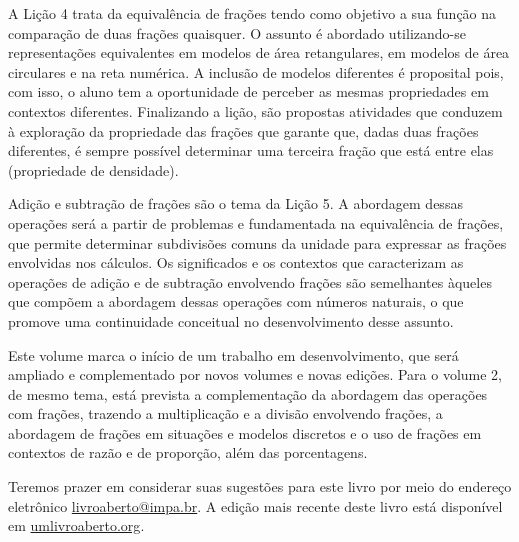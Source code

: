 A Lição 4 trata da equivalência de frações tendo como objetivo a sua função na comparação de duas frações quaisquer. O assunto é abordado utilizando-se representações equivalentes em modelos de área retangulares, em modelos de área circulares e na reta numérica. A inclusão de modelos diferentes é proposital pois, com isso, o aluno tem a oportunidade de perceber as mesmas propriedades em contextos diferentes. Finalizando a lição, são propostas atividades que conduzem à exploração da propriedade das frações que garante que, dadas duas frações diferentes, é sempre possível determinar uma terceira fração que está entre elas (propriedade de densidade).

Adição e subtração de frações são o tema da Lição 5.
A abordagem dessas operações será a partir de problemas e fundamentada na equivalência de frações, que permite determinar subdivisões comuns da unidade para expressar as frações envolvidas nos cálculos.
Os significados e os contextos que caracterizam as operações de adição e de subtração ​envolvendo frações são semelhantes àqueles que compõem a abordagem dessas operações com números naturais, ​o que ​promove​​ uma continuidade conceitual ​no desenvolvimento desse assunto.

Este volume marca o início de um trabalho em desenvolvimento, que será ampliado e complementado por novos volumes e novas edições. Para o volume 2, de mesmo tema, está prevista a complementação da abordagem das operações com frações, trazendo a multiplicação e a divisão envolvendo frações, a abordagem de frações em situações e modelos discretos e o uso de frações em contextos de razão e de proporção, além das porcentagens.

Teremos prazer em considerar suas sugestões para este livro por meio do endereço eletrônico \textcolor{blue}{\url{livroaberto@impa.br}}.
A edição mais recente deste livro está disponível em \textcolor{blue}{\url{umlivroaberto.org}}.
